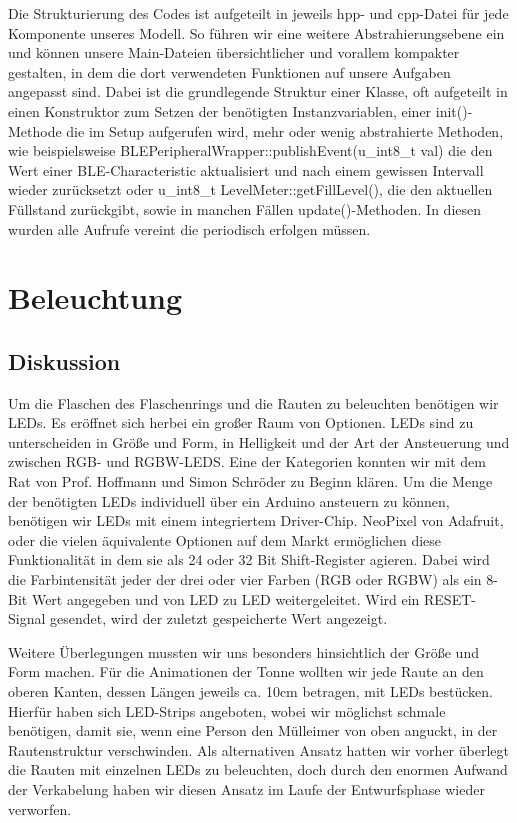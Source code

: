         Die Strukturierung des Codes ist aufgeteilt in jeweils hpp- und cpp-Datei für jede Komponente unseres Modell. So führen wir eine weitere Abstrahierungsebene ein und können unsere Main-Dateien übersichtlicher und vorallem kompakter gestalten, in dem die dort verwendeten Funktionen auf unsere Aufgaben angepasst sind.
        Dabei ist die grundlegende Struktur einer Klasse, oft aufgeteilt in einen Konstruktor zum Setzen der benötigten Instanzvariablen, einer init()-Methode die im Setup aufgerufen wird, mehr oder wenig abstrahierte  Methoden, wie beispielsweise BLEPeripheralWrapper::publishEvent(u\_int8\_t val) die den Wert einer BLE-Characteristic aktualisiert und nach einem gewissen Intervall wieder zurücksetzt oder u\_int8\_t LevelMeter::getFillLevel(), die den aktuellen Füllstand zurückgibt, sowie in manchen Fällen update()-Methoden.
        In diesen wurden alle Aufrufe vereint die periodisch erfolgen müssen.


\section{Beleuchtung}

    \subsection{Diskussion}

        Um die Flaschen des Flaschenrings und die Rauten zu beleuchten benötigen wir LEDs. Es eröffnet sich herbei ein großer Raum von Optionen. LEDs sind zu unterscheiden in Größe und Form, in Helligkeit und der Art der Ansteuerung und zwischen RGB- und RGBW-LEDS.
        Eine der Kategorien konnten wir mit dem Rat von Prof. Hoffmann und Simon Schröder zu Beginn klären. Um die Menge der benötigten LEDs individuell über ein Arduino ansteuern zu können, benötigen wir LEDs mit einem integriertem Driver-Chip. NeoPixel von Adafruit, oder die vielen äquivalente Optionen auf dem Markt ermöglichen diese Funktionalität in dem sie als 24 oder 32 Bit Shift-Register agieren. Dabei wird die Farbintensität jeder der drei oder vier Farben (RGB oder RGBW) als ein 8-Bit Wert angegeben und von LED zu LED weitergeleitet.
        Wird ein RESET-Signal gesendet, wird der zuletzt gespeicherte Wert angezeigt.

        Weitere Überlegungen mussten wir uns besonders hinsichtlich der Größe und Form machen. Für die Animationen der Tonne wollten wir jede Raute an den oberen Kanten, dessen Längen jeweils ca. 10cm betragen, mit LEDs bestücken. Hierfür haben sich LED-Strips angeboten, wobei wir möglichst schmale benötigen, damit sie, wenn eine Person den Mülleimer von oben anguckt, in der Rautenstruktur verschwinden. Als alternativen Ansatz hatten wir vorher überlegt die Rauten mit einzelnen LEDs zu beleuchten, doch durch den enormen Aufwand der Verkabelung haben wir diesen Ansatz im Laufe der Entwurfsphase wieder verworfen.

